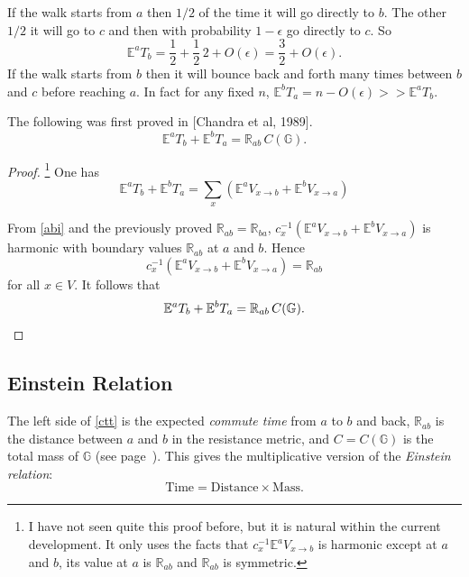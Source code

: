 \documentclass[a4paper]{amsart}
\theoremstyle{plain}
\theoremstyle{definition}
\theoremstyle{remark}
\begin{document}
If the walk starts from $ a $ then $ 1/2$ of  the time it will go directly to $ b $.  The other  $ 1/2 $ it will go to $ c $ and then with probability $  1-\epsilon $ go directly to  $ c $. So   
 \[
  \mathbb{E}^a T_b =  \frac{1}{2} + \frac{1}{2} \, 2 + O(\epsilon) = \frac{3}{2} + O(\epsilon).
  \]
 If the walk starts from $ b$ then it will bounce back and forth many times between $ b $ and $ c $ before reaching $ a $.   In fact for any fixed $ n $, $ \mathbb{E}^b T_a = n - O(\epsilon ) >>  \mathbb{E}^a T_b $.
  
\bigskip  The following was first proved  in [Chandra et al, 1989].
\begin{equation} \label{ctt} 
\boxed{\mathbb{E}^a T_b + \mathbb{E}^b T_a = \mathbb{R}_{ab}\, C( \mathbb{G} ).}
\end{equation} 

\begin{proof}%
\footnote{I have not seen quite this proof before, but it is natural within the current development.
It only uses the facts that $c_x^{-1} \mathbb{E}^a  V_{x\to b} $   is harmonic except at $a  $ and $ b $, its value at $ a $ is $ \mathbb{R}_{ab} $ and  $ \mathbb{R}_{ab} $ is symmetric.}
One has
   \[
\mathbb{E}^a T_b  + \mathbb{E}^b T_a =\sum_x   \left(\mathbb{E}^a  V_{x\to b}  +  \mathbb{E}^b  V_{x\to a} \right)
  \]

From \eqref{abi} and the previously proved $ \mathbb{R}_{ab} = \mathbb{R}_{ba}$, 
$  c_x^{-1}\left(\mathbb{E}^a  V_{x\to b}  +  \mathbb{E}^b  V_{x\to a} \right)$ 
is harmonic with boundary values $ \mathbb{R}_{ab} $ at $ a $ and $ b $.
Hence
\[
  c_x^{-1}\left(\mathbb{E}^a  V_{x\to b}  +  \mathbb{E}^b  V_{x\to a} \right) = \mathbb{R}_{ab} 
\]
for all $ x\in V $.  
It follows that 
\[
\mathbb{E}^a T_b + \mathbb{E}^b T_a  = \mathbb{R}_{ab}\, C( \mathbb{G} ).
 \qedhere
  \] 
\end{proof} 





\subsection{Einstein Relation}
The left side of  \eqref{ctt} is the expected \emph{commute time} from $ a $ to $ b $ and back, $ \mathbb{R}_{ab}$ is the distance between $ a $ and $ b $ in the resistance metric, and $ C = C( \mathbb{G} )$ is the total mass of $ \mathbb{G}  $ (see page~\pageref{tm}).  
This  gives the multiplicative version of the \emph{Einstein relation}:  
\begin{equation} \label{er1}
\boxed{\text{Time} = \text{Distance} \times \text{Mass}.}
\end{equation} 
\end{document}

